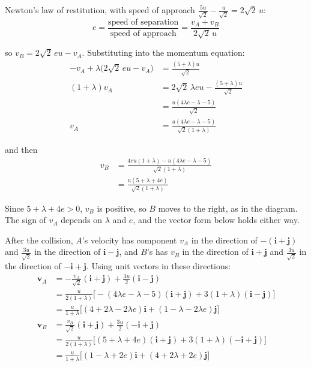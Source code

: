 \documentclass[leqno]{article}
\begin{document}
\begin{enumerate}[
  label=\textbf{\arabic*.},
  leftmargin=*,
  topsep=0pt,
  partopsep=0pt,
  parsep=0pt
]
\begin{djsSolution}
\begin{enumerate}[label=\textbf{(\alph*)}, start=1]
\begin{enumerate}[label=(\roman*), start=1]
Newton's law of restitution, with speed of approach \(\frac{5u}{\sqrt2}-\frac{u}{\sqrt2}=2\sqrt2\,u\):
\[
e=\frac{\text{speed of separation}}{\text{speed of approach}}=\frac{v_A+v_B}{2\sqrt2\,u}
\]

so \(v_B=2\sqrt2\,eu-v_A\). Substituting into the momentum equation:
\begin{align*}
-v_A+\lambda\bigl(2\sqrt2\,eu-v_A\bigr)&=\frac{(5+\lambda)u}{\sqrt2}\\
(1+\lambda)v_A&=2\sqrt2\,\lambda eu-\frac{(5+\lambda)u}{\sqrt2}\\
&=\frac{u(4\lambda e-\lambda-5)}{\sqrt2}\\
v_A&=\frac{u(4\lambda e-\lambda-5)}{\sqrt2(1+\lambda)}
\end{align*}

and then
\begin{align*}
v_B&=\frac{4eu(1+\lambda)-u(4\lambda e-\lambda-5)}{\sqrt2(1+\lambda)}\\
&=\frac{u(5+\lambda+4e)}{\sqrt2(1+\lambda)}
\end{align*}

Since \(5+\lambda+4e>0\), \(v_B\) is positive, so \(B\) moves to the right, as in the diagram. The sign of \(v_A\) depends on \(\lambda\) and \(e\), and the vector form below holds either way.

After the collision, \(A\)'s velocity has component \(v_A\) in the direction of \(-(\mathbf{i}+\mathbf{j})\) and \(\frac{3u}{\sqrt2}\) in the direction of \(\mathbf{i}-\mathbf{j}\), and \(B\)'s has \(v_B\) in the direction of \(\mathbf{i}+\mathbf{j}\) and \(\frac{3u}{\sqrt2}\) in the direction of \(-\mathbf{i}+\mathbf{j}\). Using unit vectors in these directions:
\begin{align*}
\mathbf{v}_A&=-\frac{v_A}{\sqrt2}(\mathbf{i}+\mathbf{j})+\frac{3u}{2}(\mathbf{i}-\mathbf{j})\\
&=\frac{u}{2(1+\lambda)}\bigl[-(4\lambda e-\lambda-5)(\mathbf{i}+\mathbf{j})+3(1+\lambda)(\mathbf{i}-\mathbf{j})\bigr]\\
&=\frac{u}{1+\lambda}\bigl[(4+2\lambda-2\lambda e)\mathbf{i}+(1-\lambda-2\lambda e)\mathbf{j}\bigr]\\
\mathbf{v}_B&=\frac{v_B}{\sqrt2}(\mathbf{i}+\mathbf{j})+\frac{3u}{2}(-\mathbf{i}+\mathbf{j})\\
&=\frac{u}{2(1+\lambda)}\bigl[(5+\lambda+4e)(\mathbf{i}+\mathbf{j})+3(1+\lambda)(-\mathbf{i}+\mathbf{j})\bigr]\\
&=\frac{u}{1+\lambda}\bigl[(1-\lambda+2e)\mathbf{i}+(4+2\lambda+2e)\mathbf{j}\bigr]
\end{align*}


\end{enumerate}
\end{enumerate}
\end{djsSolution}
\end{enumerate}
\end{document}
